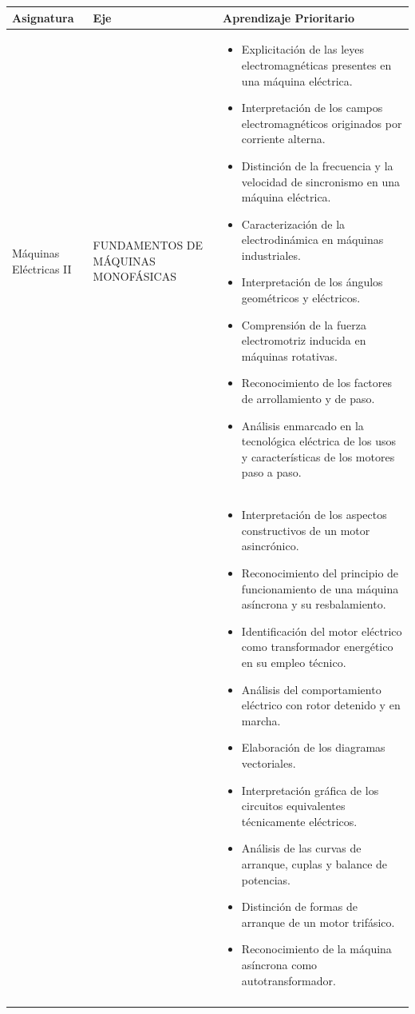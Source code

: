 \documentclass[../main]{subfiles}
\begin{document}
\begin{longtable}{|p{4cm}|p{4cm}|p{7cm}|} \hline
         Asignatura& Eje & Aprendizaje Prioritario  \\ \hline \hline
         Máquinas Eléctricas II& FUNDAMENTOS DE MÁQUINAS MONOFÁSICAS & \begin{itemize} \item Explicitación de las leyes electromagnéticas presentes en una
máquina eléctrica.
\item Interpretación de los campos electromagnéticos originados por corriente alterna.
\item Distinción de la frecuencia y la velocidad de sincronismo en una máquina eléctrica.
\item Caracterización de la electrodinámica en máquinas industriales.
\item Interpretación de los ángulos geométricos y eléctricos.
\item Comprensión de la fuerza electromotriz inducida en máquinas rotativas.
\item Reconocimiento de los factores de arrollamiento y de paso.
\item Análisis enmarcado en la tecnológica eléctrica de los usos y características de los motores paso a paso.
\end{itemize} \\ \hline
& & 
\begin{itemize}
\item Interpretación de los aspectos constructivos de un motor asincrónico.
\item Reconocimiento del principio de funcionamiento de una máquina asíncrona y su resbalamiento.
\item Identificación del motor eléctrico como transformador energético en su empleo técnico.
\item Análisis del comportamiento eléctrico con rotor detenido y en marcha.
\item Elaboración de los diagramas vectoriales.
\item Interpretación gráfica de los circuitos equivalentes técnicamente eléctricos.
\item Análisis de las curvas de arranque, cuplas y balance de potencias.
\item Distinción de formas de arranque de un motor trifásico.
\item Reconocimiento de la máquina asíncrona como
autotransformador.
\end{itemize} \\ \hline
& & 
\begin{itemize}



\end{itemize}
\end{longtable}
\end{document}
